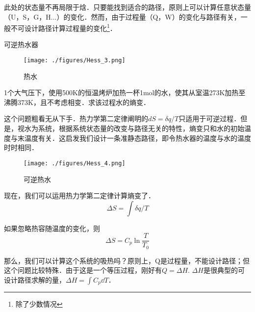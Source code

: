 此处的状态量不再局限于焓．只要能找到适合的路径，原则上可以计算任意状态量（U，S，G，H...）的变化．然而，由于过程量（Q，W）的变化与路径有关，一般不可设计路径计算过程量的变化\footnote{除了少数情况}．

\begin{example}{可逆热水器}
\begin{figure}[ht]
\centering
\texttt{[image: ./figures/Hess\_3.png]}
\caption{热水} \label{Hess_fig3}
\end{figure}
1个大气压下，使用500K的恒温烤炉加热一杯1mol的水，使其从室温273K加热至沸腾373K，且不考虑相变．求该过程水的熵变．

这个问题粗看无从下手．热力学第二定律阐明的$dS=\delta q/T$只适用于可逆过程．但是，视水为系统，根据系统状态量的改变与路径无关的特性，熵变只和水的初始温度与末温度有关．这启发我们设计一条准静态路径，即令热水器的温度与水的温度时时相同．

\begin{figure}[ht]
\centering
\texttt{[image: ./figures/Hess\_4.png]}
\caption{可逆热水} \label{Hess_fig4}
\end{figure}
现在，我们可以运用热力学第二定律计算熵变了．
$$\Delta S=\int \delta q/T$$

如果忽略热容随温度的变化，则 
$$\Delta S=C_p \ln \frac{T}{T_0}$$

那么，我们可以计算这个系统的吸热吗？原则上，Q是过程量，不能设计路径；但这个问题比较特殊．由于这是一个等压过程，刚好有$Q=\Delta H$. $\Delta H$是很典型的可设计路径求解的量，$\Delta H = \int C_p \dd T$．
\end{example}
